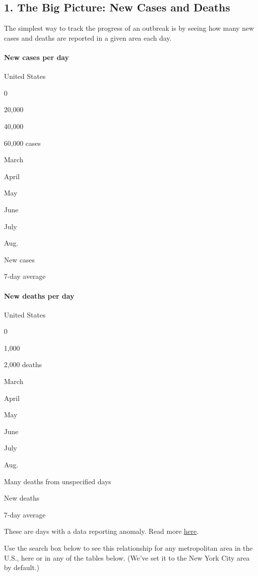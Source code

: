 \hypertarget{1-the-big-picture-new-cases-and-deaths}{%
\subsection{1. The Big Picture: New Cases and
Deaths}\label{1-the-big-picture-new-cases-and-deaths}}

The simplest way to track the progress of an outbreak is by seeing how
many new cases and deaths are reported in a given area each day.

\hypertarget{new-cases-per-day}{%
\paragraph{New cases per day}\label{new-cases-per-day}}

United States

0

20,000

40,000

60,000 cases

March

April

May

June

July

Aug.

New cases

7-day average

\hypertarget{new-deaths-per-day}{%
\paragraph{New deaths per day}\label{new-deaths-per-day}}

United States

0

1,000

2,000 deaths

March

April

May

June

July

Aug.

Many deaths from unspecified days

New deaths

7-day average

These are days with a data reporting anomaly. Read more
\protect\hyperlink{anomaly-notes}{here}.

Use the search box below to see this relationship for any metropolitan
area in the U.S., here or in any of the tables below. (We've set it to
the New York City area by default.)

